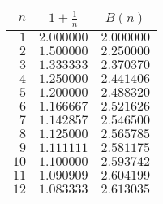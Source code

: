 \begin{tabular}{rcc}                    \toprule
$n$  & $1 + \frac{1}{n}$ & $B(n)$     \\\midrule
$1$  & $2.000000$        & $2.000000$ \\
$2$  & $1.500000$        & $2.250000$ \\
$3$  & $1.333333$        & $2.370370$ \\
$4$  & $1.250000$        & $2.441406$ \\
$5$  & $1.200000$        & $2.488320$ \\
$6$  & $1.166667$        & $2.521626$ \\
$7$  & $1.142857$        & $2.546500$ \\
$8$  & $1.125000$        & $2.565785$ \\
$9$  & $1.111111$        & $2.581175$ \\
$10$ & $1.100000$        & $2.593742$ \\
$11$ & $1.090909$        & $2.604199$ \\
$12$ & $1.083333$        & $2.613035$ \\\bottomrule
\end{tabular}
